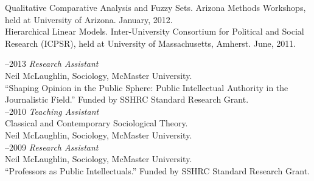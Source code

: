 \documentclass[11pt,usenames,dvipsnames]{article}
\begin{document}


\noindent Qualitative Comparative Analysis and Fuzzy Sets. Arizona Methods Workshops, held at University of Arizona. January, 2012.\\

\noindent Hierarchical Linear Models. Inter-University Consortium for Political and Social Research (ICPSR), held at University of Massachusetts, Amherst. June, 2011.\\



–2013 {\it Research Assistant}\\
Neil McLaughlin, Sociology, McMaster University.\\ 
``Shaping Opinion in the Public Sphere: Public Intellectual Authority in the Journalistic Field.'' Funded by SSHRC Standard Research Grant.\\

–2010 {\it Teaching Assistant}\\
Classical and Contemporary Sociological Theory.\\
Neil McLaughlin, Sociology, McMaster University.\\

–2009 {\it Research Assistant}\\
Neil McLaughlin, Sociology, McMaster University.\\ 
``Professors as Public Intellectuals.'' Funded by SSHRC Standard Research Grant.\\



\end{document}
